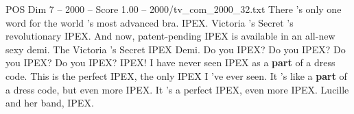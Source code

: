 \begin{textsample}{POS Dim 7 – 2000 – Score 1.00 – 2000/tv\_com\_2000\_32.txt}  \label{ex:f7_pos_060}
There 's only one word for the world 's most advanced bra.
IPEX.
Victoria 's Secret 's revolutionary IPEX.
And now, patent-pending IPEX is available in an all-new sexy demi.
The Victoria 's Secret IPEX Demi.
Do you IPEX?
Do you IPEX?
Do you IPEX?
Do you IPEX?
IPEX!
I have never seen IPEX as a \textbf{part} of a dress code.
This is the perfect IPEX, the only IPEX I 've ever seen.
It 's like a \textbf{part} of a dress code, but even more IPEX.
It 's a perfect IPEX, even more IPEX.
Lucille and her band, IPEX.

\end{textsample}
